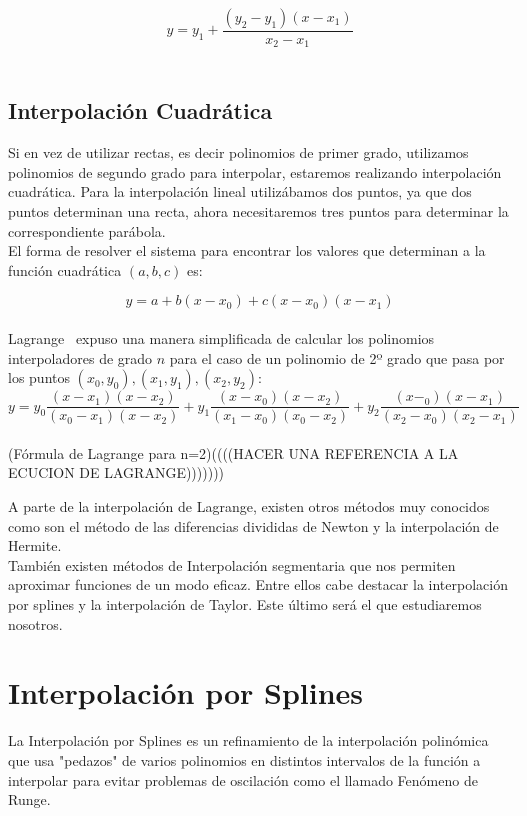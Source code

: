 \documentclass[spanish,a4paper,11pt,twoside]{report}
\begin{document}
\[
y = y_1 + \frac{(y_2 - y_1)(x - x_1)}{x_2 - x_1}
\]\\ 






\subsection{Interpolación Cuadrática}
Si en vez de utilizar rectas, es decir polinomios de primer grado, utilizamos polinomios de segundo grado para interpolar, estaremos realizando interpolación cuadrática. Para la interpolación lineal utilizábamos dos puntos, ya que dos puntos determinan una recta, ahora necesitaremos tres puntos para determinar la correspondiente parábola.\\
El forma de resolver el sistema para encontrar los valores que determinan a la función cuadrática $(a, b, c)$ es:

\[
y = a + b(x - x_0) + c(x - x_0)(x - x_1)
\]\\

Lagrange ~\cite{Lagrange}expuso una manera simplificada de calcular los polinomios interpoladores de grado $n$ para el caso de un polinomio de 2º grado que pasa por los puntos $(x_0, y_0), (x_1, y_1), (x_2, y_2)$:\\

\[
y = y_0\frac{(x - x_1)(x - x_2)}{(x_0 - x_1)(x - x_2)} + y_1\frac{(x- x_0)(x - x_2)}{(x_1 - x_0)(x_0 - x_2)} + y_2\frac{(x - _0)(x - x_1)}{(x_2 - x_0)(x_2 - x_1)}
\]\\ 

(Fórmula de Lagrange para n=2)((((HACER UNA REFERENCIA A LA ECUCION DE LAGRANGE)))))))

A parte de la interpolación de Lagrange, existen otros métodos muy conocidos como son el método de las diferencias divididas de Newton y la interpolación de Hermite.\\
También existen métodos de Interpolación segmentaria que nos permiten aproximar funciones de un modo eficaz. Entre ellos cabe destacar la interpolación por splines y la interpolación de Taylor. Este último será el que estudiaremos nosotros.



\section{Interpolación por Splines}
	La Interpolación por Splines es un refinamiento de la interpolación polinómica que usa "pedazos" de varios polinomios en distintos intervalos de la función a interpolar para evitar problemas de oscilación como el llamado Fenómeno de Runge.\\
\end{document}
